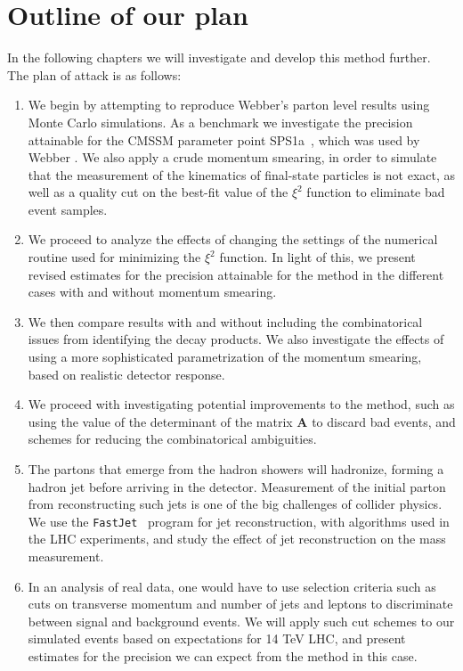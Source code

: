 \documentclass[twoside,english]{uiofysmaster}
\begin{document}
\section{Outline of our plan}
In the following chapters we will investigate and develop this method further. The plan of attack is as follows:
\begin{enumerate}
  \item We begin by attempting to reproduce Webber's parton level results using Monte Carlo simulations. As a benchmark we investigate the precision attainable for the CMSSM parameter point SPS1a~\cite{Allanach:2002nj}, which was used by Webber \cite{Webber:2009vm}. We also apply a crude momentum smearing, in order to simulate that the measurement of the kinematics of final-state particles is not exact, as well as a quality cut on the best-fit value of the $\xi^2$ function to eliminate bad event samples.
  \item We proceed to analyze the effects of changing the settings of the numerical routine used for minimizing the $\xi^2$ function. In light of this, we present revised estimates for the precision attainable for the method in the different cases with and without momentum smearing.
  \item We then compare results with and without including the combinatorical issues from identifying the decay products. We also investigate the effects of using a more sophisticated parametrization of the momentum smearing, based on realistic detector response.
  \item We proceed with investigating potential improvements to the method, such as using the value of the determinant of the matrix $\mathbf A$ to discard bad events, and schemes for reducing the combinatorical ambiguities.
  \item The partons that emerge from the hadron showers will hadronize, forming a hadron jet before arriving in the detector. Measurement of the initial parton from reconstructing such jets is one of the big challenges of collider physics. We use the {\tt FastJet}~\cite{Cacciari:2011ma} program for jet reconstruction, with algorithms used in the LHC experiments, and study the effect of jet reconstruction on the mass measurement.
  \item In an analysis of real data, one would have to use selection criteria such as cuts on transverse momentum and number of jets and leptons to discriminate between signal and background events. We will apply such cut schemes to our simulated events based on expectations for 14 TeV LHC, and present estimates for the precision we can expect from the method in this case.
\end{enumerate}
\end{document}
